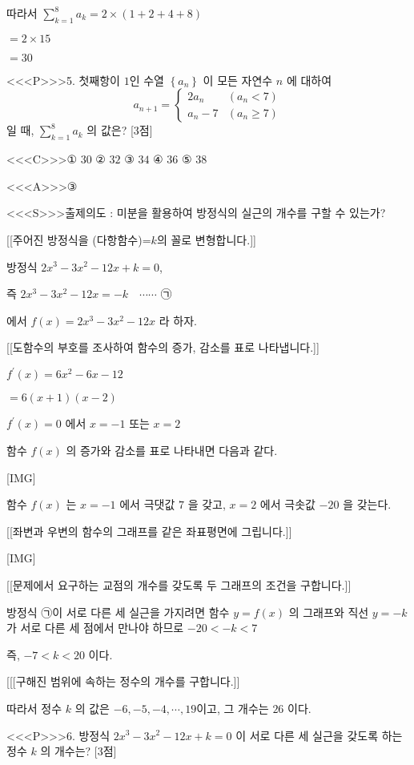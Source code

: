 \documentclass{oblivoir}
\begin{document}
따라서
$\displaystyle\sum_{k=1}^{8} a_{k}=2 \times(1+2+4+8)$

$=2 \times 15$

$=30$

<<<P>>>5. 첫째항이 $1$인 수열 $\left\{a_{n}\right\}$ 이 모든 자연수 $n$ 에 대하여
$$
a_{n+1}=\begin{cases}
2 a_{n} & \left(a_{n}< 7\right) \\
a_{n}-7 & \left(a_{n} \geq 7\right)
\end{cases}
$$
일 때, $\displaystyle\sum_{k=1}^{8} a_{k}$ 의 값은? [3점]

<<<C>>>① $30$
② $32$
③ $34$
④ $36$
⑤ $38$

<<<A>>>③

<<<S>>>출제의도 : 미분을 활용하여 방정식의 실근의 개수를 구할 수 있는가?


[[주어진 방정식을 (다항함수)=$k$의 꼴로 변형합니다.]]

방정식 $2 x^{3}-3 x^{2}-12 x+k=0$,

즉 $2 x^{3}-3 x^{2}-12 x=-k \quad \cdots \cdots$ ㉠

에서 $f(x)=2 x^{3}-3 x^{2}-12 x$ 라 하자.

[[도함수의 부호를 조사하여 함수의 증가, 감소를 표로 나타냅니다.]]

$f^{\prime}(x)=6 x^{2}-6 x-12$

$=6(x+1)(x-2)$

$f^{\prime}(x)=0$ 에서 $x=-1$ 또는 $x=2$

함수 $f(x)$ 의 증가와 감소를 표로 나타내면 다음과 같다.

[IMG]

함수 $f(x)$ 는 $x=-1$ 에서 극댓값 $7$ 을 갖고, $x=2$ 에서 극솟값 $-20$ 을 갖는다.

[[좌변과 우변의 함수의 그래프를 같은 좌표평면에 그립니다.]]

[IMG]

[[문제에서 요구하는 교점의 개수를 갖도록 두 그래프의 조건을 구합니다.]]

방정식 ㉠이 서로 다른 세 실근을 가지려면 함수 $y=f(x)$ 의 그래프와 직선 $y=-k$ 가 서로 다른 세 점에서 만나야 하므로 $-20< -k< 7$

즉, $-7< k< 20$ 이다.

[[[구해진 범위에 속하는 정수의 개수를 구합니다.]]

따라서 정수 $k$ 의 값은 $-6,-5,-4, \cdots, 19$이고, 그 개수는 $26$ 이다.

<<<P>>>6. 방정식 $2 x^{3}-3 x^{2}-12 x+k=0$ 이 서로 다른 세 실근을 갖도록 하는 정수 $k$ 의 개수는? [3점]
\end{document}
